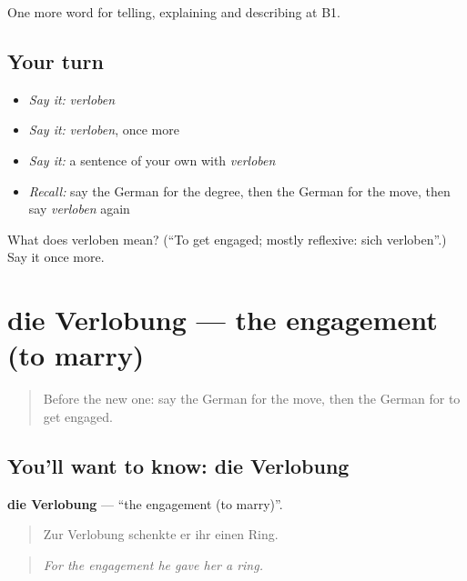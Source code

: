\begin{grammarlens}[title={What you've built}]
One more word for telling, explaining and describing at B1.
\end{grammarlens}

\subsection*{Your turn}
\begin{itemize}
\raggedright
  \item \emph{Say it:} \emph{verloben}
  \item \emph{Say it:} \emph{verloben}, once more
  \item \emph{Say it:} a sentence of your own with \emph{verloben}
  \item \emph{Recall:} say the German for the degree, then the German for the move, then say \emph{verloben} again
\end{itemize}

\begin{tcolorbox}[breakable,colback=teal!4,colframe=teal!35!black,title={Before you move on}]
What does verloben mean? (\textquotedblleft{}To get engaged; mostly reflexive: sich verloben\textquotedblright{}.) Say it once more.
\end{tcolorbox}
\section[die Verlobung]{die Verlobung — the engagement (to marry)}

\label{lesson:GE-C298-verlobung}



\begin{quote}
Before the new one: say the German for the move, then the German for to get engaged.
\end{quote}

\subsection*{You'll want to know: die Verlobung}
\textbf{die Verlobung} — \textquotedblleft{}the engagement (to marry)\textquotedblright{}.

\begin{quote}
Zur Verlobung schenkte er ihr einen Ring.
\end{quote}

\begin{quote}
\emph{For the engagement he gave her a ring.}
\end{quote}

